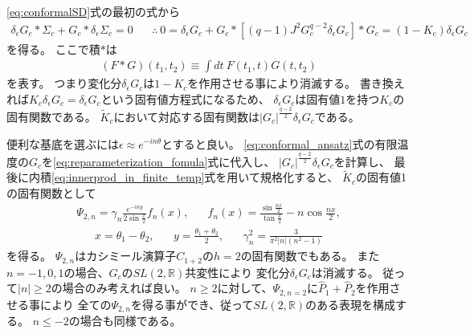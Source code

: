 \eqref{eq:conformalSD}式の最初の式から
\begin{align}
	\delta_{\epsilon}G_c * \Sigma_c + G_c * \delta_{\epsilon}\Sigma_c = 0\hspace{20pt}
	\therefore\ 
	0 = \delta_{\epsilon}G_c + G_c * [(q-1)J^2G_c^{q-2}\delta_{\epsilon}G_c] * G_c
	= (1 - K_c)\delta_{\epsilon}G_c
\end{align}
を得る。
ここで積$*$は
\begin{align}
	(F*G)(t_1, t_2) \equiv \int dt\ F(t_1, t)G(t, t_2)
\end{align}
を表す。
つまり変化分$\delta_{\epsilon}G_c$は$1 - K_c$を作用させる事により消滅する。
書き換えれば$K_c\delta_{\epsilon}G_c = \delta_{\epsilon}G_c$という固有値方程式になるため、
$\delta_{\epsilon}G_c$は固有値$1$を持つ$K_c$の固有関数である。
$\tilde{K}_c$において対応する固有関数は$|G_c|^{\frac{q-2}{2}}\delta_{\epsilon}G_c$である。

便利な基底を選ぶには$\epsilon \approx e^{-in\theta}$とすると良い。
\eqref{eq:conformal_ansatz}式の有限温度の$G_c$を\eqref{eq:reparameterization_fomula}式に代入し、
$|G_c|^{\frac{q-2}{2}}\delta_{\epsilon}G_c$を計算し、
最後に内積\eqref{eq:innerprod_in_finite_temp}式を用いて規格化すると、
$\tilde{K}_c$の固有値1の固有関数として
\begin{align}
	\Psi_{2,n} = \gamma_n\frac{e^{-iny}}{2\sin\frac{x}{2}}f_n(x),\hspace{20pt}
	f_n(x) = \frac{\sin\frac{nx}{2}}{\tan\frac{x}{2}} - n\cos\frac{nx}{2},
	\label{eq:eigenfunc_with_eigenvalue_1}
\end{align}
\begin{align}
	x = \theta_1 - \theta_2,\hspace{20pt}
	y = \frac{\theta_1 + \theta_2}{2},\hspace{20pt}
	\gamma_n^2 = \frac{3}{\pi^2|n|(n^2 - 1)}
	\label{eq:x_y_squaregamma}
\end{align}
を得る。
$\Psi_{2,n}$はカシミール演算子$C_{1+2}$の$h=2$の固有関数でもある。
また$n=-1,0,1$の場合、$G_c$の$SL(2,\mathbb{R})$共変性により
変化分$\delta_{\epsilon}G_c$は消滅する。
従って$|n| \geq 2$の場合のみ考えれば良い。
$n \geq 2$に対して、$\Psi_{2,n=2}$に$\hat{P}_1 + \hat{P}_2$を作用させる事により
全ての$\Psi_{2,n}$を得る事ができ、従って$SL(2,\mathbb{R})$のある表現を構成する。
$n \leq -2$の場合も同様である。

